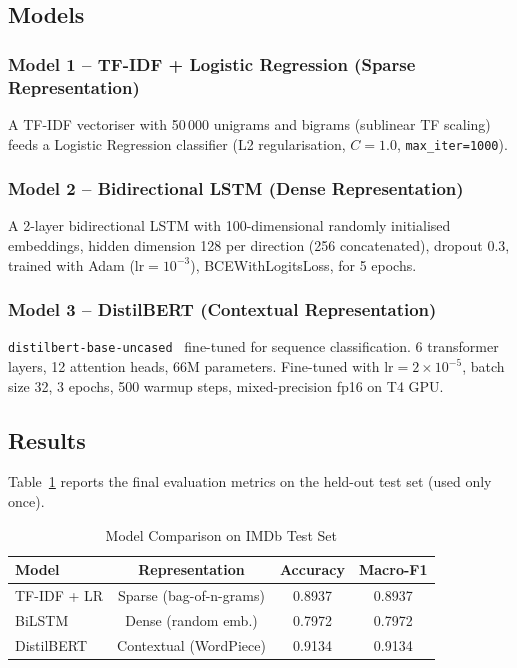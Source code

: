 \subsection{Models}

\subsubsection{Model 1 -- TF-IDF + Logistic Regression (Sparse Representation)}

A TF-IDF vectoriser with 50\,000 unigrams and bigrams (sublinear TF scaling) feeds
a Logistic Regression classifier (L2 regularisation, $C=1.0$, \texttt{max\_iter=1000}).

\subsubsection{Model 2 -- Bidirectional LSTM (Dense Representation)}

A 2-layer bidirectional LSTM with 100-dimensional randomly initialised embeddings,
hidden dimension 128 per direction (256 concatenated), dropout 0.3, trained with
Adam ($\text{lr}=10^{-3}$), BCEWithLogitsLoss, for 5 epochs.

\subsubsection{Model 3 -- DistilBERT (Contextual Representation)}

\texttt{distilbert-base-uncased}~\cite{sanh2019distilbert} fine-tuned for sequence
classification. 6 transformer layers, 12 attention heads, 66M parameters.
Fine-tuned with $\text{lr}=2\times10^{-5}$, batch size 32, 3 epochs, 500 warmup
steps, mixed-precision fp16 on T4 GPU.

\subsection{Results}

Table~\ref{tab:q1_results} reports the final evaluation metrics on the held-out
test set (used only once).

\begin{table}[H]
  \centering
  \caption{Model Comparison on IMDb Test Set}
  \label{tab:q1_results}
  \begin{tabular}{lccc}
    \toprule
    \textbf{Model} & \textbf{Representation} & \textbf{Accuracy} & \textbf{Macro-F1} \\
    \midrule
    TF-IDF + LR    & Sparse (bag-of-n-grams)  & 0.8937 & 0.8937 \\
    BiLSTM         & Dense (random emb.)      & 0.7972 & 0.7972 \\
    DistilBERT     & Contextual (WordPiece)   & 0.9134 & 0.9134 \\
    \bottomrule
  \end{tabular}
\end{table}

